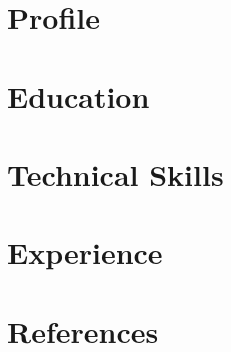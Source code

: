 \documentclass[11pt, a4paper, roman]{moderncv}
\begin{document}
\maketitle

\section{Profile}


\section{Education}


\section{Technical Skills}

\pagebreak

\section{Experience}


\section{References}


\iffalse

\fi
\end{document}
